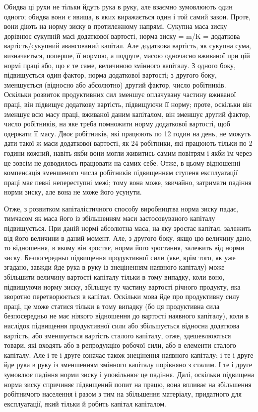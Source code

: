 Обидва ці рухи не тільки йдуть рука в руку, але взаємно
зумовлюють один одного; обидва вони є явища, в яких
виражається один і той самий закон. Проте, вони діють на
норму зиску в протилежному напрямі. Сукупна маса зиску
дорівнює сукупній масі додаткової вартості, норма зиску =
m/K = додаткова вартість/сукупний авансований капітал. Але додаткова вартість, як сукупна сума,
визначається, поперше, її нормою, а подруге,
масою одночасно вживаної при цій нормі праці або, що є те
саме, величиною змінного капіталу. З одного боку, підвищується
один фактор, норма додаткової вартості; з другого боку, зменшується
(відносно або абсолютно) другий фактор, число робітників.
Оскільки розвиток продуктивних сил зменшує оплачувану
частину вживаної праці, він підвищує додаткову вартість, підвищуючи
її норму; проте, оскільки він зменшує всю масу
праці, вживаної даним капіталом, він зменшує другий фактор,
число робітників, на яке треба помножити норму додаткової
вартості, щоб одержати її масу. Двоє робітників, які працюють
по 12 годин на день, не можуть дати такої ж маси додаткової вартості,
як 24 робітники, які працюють тільки по 2 години кожний,
навіть якби вони могли живитись самим повітрям і якби їм через це
зовсім не доводилось працювати на самих себе. Отже, в цьому
відношенні компенсація зменшеного числа робітників підвищенням
ступеня експлуатації праці має певні непереступні межі;
тому вона може, звичайно, затримати падіння норми зиску, але
вона не може його усунути.

Отже, з розвитком капіталістичного способу виробництва
норма зиску падає, тимчасом як маса його із збільшенням маси
застосовуваного капіталу підвищується. При даній нормі абсолютна
маса, на яку зростає капітал, залежить від його величини
в даний момент. Але, з другого боку, якщо цю величину дано,
то відношення, в якому він зростає, норма його зростання, залежить
від норми зиску. Безпосередньо підвищення продуктивної
сили (яке, крім того, як уже згадано, завжди йде рука в руку із
знеціненням наявного капіталу) може збільшити величину вартості
капіталу тільки в тому випадку, коли воно, підвищуючи
норму зиску, збільшує ту частину вартості річного продукту,
яка зворотно перетворюється в капітал. Оскільки мова йде про
продуктивну силу праці, це може статися тільки в тому випадку
(бо ця продуктивна сила безпосередньо не має ніякого відношення
до вартості наявного капіталу), коли в наслідок підвищення
продуктивної сили або збільшується відносна додаткова
вартість, або зменшується вартість сталого капіталу, отже, здешевлюються
товари, які входять або в репродукцію робочої сили,
або в елементи сталого капіталу. Але і те і друге означає також
знецінення наявного капіталу; і те і друге йде рука в руку із
зменшенням змінного капіталу порівняно з сталим. І те і друге
зумовлює падіння норми зиску і уповільнює це падіння. Далі,
оскільки підвищена норма зиску спричиняє підвищений попит на
працю, вона впливає на збільшення робітничого населення і разом
з тим на збільшення матеріалу, придатного для експлуатації, який
тільки й робить капітал капіталом.

